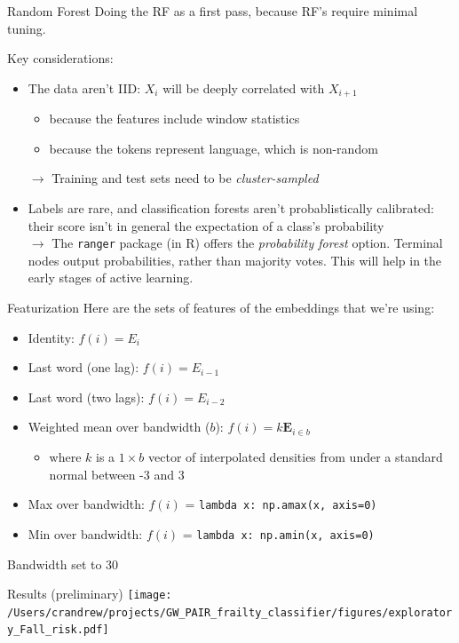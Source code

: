 \documentclass[10pt]{beamer}
\begin{document}
\begin{frame}{Random Forest}
Doing the RF as a first pass, because RF's require minimal tuning.

Key considerations:
\begin{itemize}
\item The data aren't IID:  $X_i$ will be deeply correlated with $X_{i+1}$
	\begin{itemize}
	\item because the features include window statistics
	\item because the tokens represent language, which is non-random
	\end{itemize}
$\rightarrow$ Training and test sets need to be \textit{cluster-sampled}
\item Labels are rare, and classification forests aren't probablistically calibrated:  their score isn't in general the expectation of a class's probability\\
$\rightarrow$ The \texttt{ranger} package (in R) offers the \textit{probability forest} option.  Terminal nodes output probabilities, rather than majority votes.  This will help in the early stages of active learning.
\end{itemize}
\end{frame}

\begin{frame}{Featurization}
Here are the sets of features of the embeddings that we're using:
\begin{itemize}
\item Identity:  $f(i) = E_i$
\item Last word (one lag): $f(i) = E_{i-1}$
\item Last word (two lags): $f(i) = E_{i-2}$
\item Weighted mean over bandwidth ($b$): $f(i) = k\bm{E}_{i \in b}$
	\begin{itemize}
	\item where $k$ is a $1 \times b$ vector of interpolated densities from under a standard normal between -3 and 3
	\end{itemize}
\item Max over bandwidth: $f(i)$ = \texttt{lambda x: np.amax(x, axis=0)}
\item Min over bandwidth: $f(i)$ = \texttt{lambda x: np.amin(x, axis=0)}
\end{itemize}
Bandwidth set to 30
\end{frame}


\begin{frame}{Results (preliminary)}
\texttt{[image: /Users/crandrew/projects/GW\_PAIR\_frailty\_classifier/figures/exploratory\_Fall\_risk.pdf]}
\end{frame}
\end{document}
